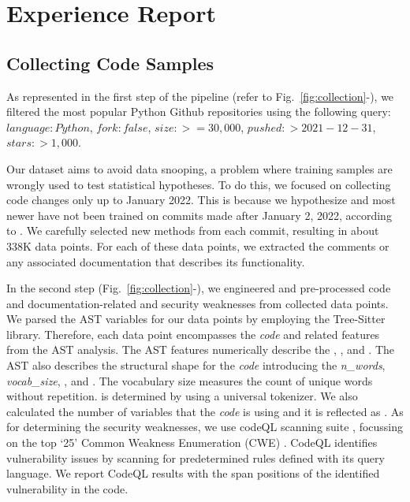 \section{Experience Report}\label{sec:experience}

\subsection{Collecting Code Samples}


As represented in the first step of the pipeline (refer to Fig.~\ref{fig:collection}-),  we filtered the most popular Python Github repositories using the following query: $language:Python$, $fork:false$, $size:>=30,000$,  $pushed:>2021-12-31$, $stars:>1,000$.

Our dataset aims to avoid data snooping, a problem where training samples are wrongly used to test statistical hypotheses. To do this, we focused on collecting code changes only up to January 2022. This is because we hypothesize \chatgpt and most newer \llms have not been trained on commits made after January 2, 2022, according to \cite{openai2023gpt4}. We carefully selected new methods from each commit, resulting in about 338K data points. For each of these data points, we extracted the comments or any associated documentation that describes its functionality.

In the second step (Fig.~\ref{fig:collection}-), we engineered and pre-processed code and documentation-related and security weaknesses from collected data points. We parsed the AST variables for our data points by employing the Tree-Sitter library. Therefore, each data point encompasses the \textit{code} and related features from the AST analysis. The AST features numerically describe the \ASTerrors, \ASTlevels, and \ASTnodes. The AST also describes the structural shape for the \textit{code} introducing the \textit{n\_words}, \textit{vocab\_size}, \tokenCount, and \whitespaces. The vocabulary size measures the count of unique words without repetition. \tokenCount is determined by using a universal tokenizer. We also calculated the number of variables that the \textit{code} is using and it is reflected as \identifiers. As for determining the security weaknesses, we use codeQL scanning suite \cite{noauthor_codeql_nodate}, focussing on the top `25'  Common Weakness Enumeration (CWE) \cite{noauthor_cwe_nodate}. CodeQL identifies vulnerability issues by scanning for predetermined rules defined with its query language. We report CodeQL results with the span positions of the identified vulnerability in the code. 

